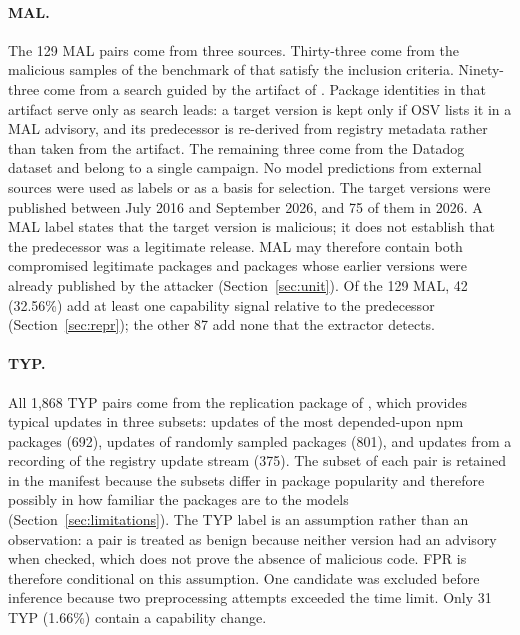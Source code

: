 \documentclass[a4paper,fleqn]{cas-dc}
\begin{document}
\paragraph{MAL.} The 129 MAL pairs come from three sources. Thirty-three come
from the malicious samples of the benchmark of \citet{guo2026effective} that
satisfy the inclusion criteria. Ninety-three come from a search guided by the
artifact of \citet{draz2026version}. Package identities in that artifact serve
only as search leads: a target version is kept only if OSV \citep{osv} lists it
in a MAL advisory, and its predecessor is re-derived from registry metadata
rather than taken from the artifact.
The remaining three come from the Datadog dataset \citep{datadog2023dataset}
and belong to a single campaign.
No model predictions from external sources were used as labels or as a basis
for selection. The target versions were published between July 2016 and
September 2026, and 75 of them in 2026. A MAL label states that the target
version is malicious; it does not establish that the predecessor was a
legitimate release. MAL may therefore contain both compromised legitimate
packages and packages whose earlier versions were already published by the
attacker (Section~\ref{sec:unit}). Of the 129 MAL, 42 (32.56\%) add at least
one capability signal relative to the predecessor (Section~\ref{sec:repr});
the other 87 add none that the extractor detects.

\paragraph{TYP.} All 1,868 TYP pairs come from the replication package of
\citet{wyss2025evaluating}, which provides typical updates in three subsets:
updates of the most depended-upon npm packages (692), updates of randomly
sampled packages (801), and updates from a recording of the registry update
stream (375). The subset of each pair is retained in the manifest because the
subsets differ in package popularity and therefore possibly in how familiar the
packages are to the models (Section~\ref{sec:limitations}). The TYP label is an
assumption rather than an observation: a pair is treated as benign because
neither version had an advisory when checked, which does not prove the absence
of malicious code. FPR is therefore conditional on this assumption. One
candidate was excluded before inference because two preprocessing attempts
exceeded the time limit. Only 31 TYP (1.66\%) contain a capability change.
\end{document}
